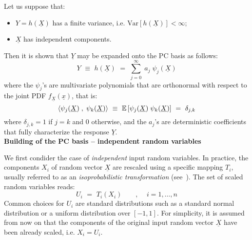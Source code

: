 {Let us suppose that:
\begin{itemize}
 \item $Y = h(\underline{X})$ has a finite variance, i.e. $\mbox{Var}[h(\underline{X})] < \infty$;
 \item $\underline{X}$ has independent components. 
\end{itemize}
Then it is shown that $\underline{Y}$ may be expanded onto the PC basis as follows:
\begin{equation} \label{eq:PC}
    Y \, \,  \equiv \, \,  h(\underline{X}) \, \, = \, \, \sum_{j=0}^{\infty} \; a_{j} \; \psi_{j}(\underline{X})
\end{equation}
where the $\psi_{j}$'s are multivariate polynomials that are orthonormal with respect to the joint PDF $f_{\underline{X}}(\underline{x})$, that is:
\begin{equation}  
    \langle \psi_{j}(\underline{X}) \; , \; \psi_{k}(\underline{X}) \rangle \, \, \equiv \, \, \mathbb{E}\left[ \psi_{j}(\underline{X}) \; \psi_{k}(\underline{X}) \right] \, \, = \, \, \delta_{j,k}
\end{equation}
where $\delta_{j,k} = 1$ if $j=k$ and 0 otherwise, and the $a_{j}$'s are deterministic coefficients that fully characterize the response $\underline{Y}$. \\







\textbf{Building of the PC basis -- independent random variables} \vspace{2mm}

We first condider the case of \emph{independent} input random variables. In practice, the components $X_i$ of random vector $\underline{X}$ are rescaled using a specific mapping $T_i$, usually referred to as an \emph{isoprobabilistic transformation} (see~). The set of scaled random variables reads:
\begin{equation} \label{eq:PC_isotransfo}
    U_i \, \, = \, \, T_i(X_i) \quad \quad , \quad \, i=1,\dots,n
\end{equation}
Common choices for $U_i$ are standard distributions such as a standard normal distribution or a uniform distribution over $[-1,1]$. For simplicity, it is assumed from now on that the components of the original input random vector $\underline{X}$ have been already scaled, i.e. $X_i = U_i$. \\

}

